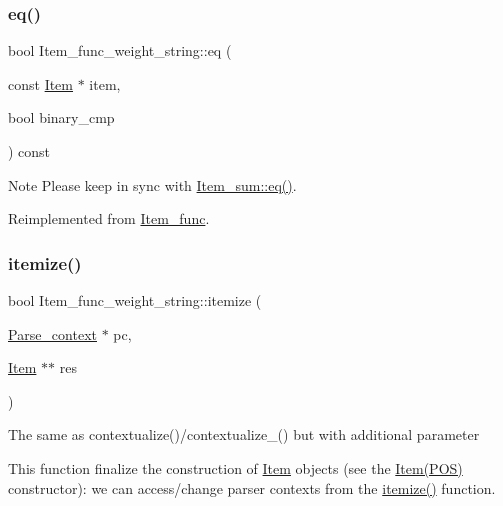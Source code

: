 \subsubsection{\texorpdfstring{eq()}{eq()}}
{\footnotesize\ttfamily bool Item\+\_\+func\+\_\+weight\+\_\+string\+::eq (\begin{DoxyParamCaption}\item[{const \mbox{\hyperlink{classItem}{Item}} $\ast$}]{item,  }\item[{bool}]{binary\+\_\+cmp }\end{DoxyParamCaption}) const\hspace{0.3cm}{\ttfamily [virtual]}}

\begin{DoxyNote}{Note}
Please keep in sync with \mbox{\hyperlink{classItem__sum_aeab749252b834e0be4f00aac8ca523f5}{Item\+\_\+sum\+::eq()}}. 
\end{DoxyNote}


Reimplemented from \mbox{\hyperlink{classItem__func_a3de3f23377e6f0006dfccd375086365f}{Item\+\_\+func}}.

\mbox{\label{classItem__func__weight__string_ad8dca90ccc2473a483b575462bb6fbb5}} 
\subsubsection{\texorpdfstring{itemize()}{itemize()}}
{\footnotesize\ttfamily bool Item\+\_\+func\+\_\+weight\+\_\+string\+::itemize (\begin{DoxyParamCaption}\item[{\mbox{\hyperlink{structParse__context}{Parse\+\_\+context}} $\ast$}]{pc,  }\item[{\mbox{\hyperlink{classItem}{Item}} $\ast$$\ast$}]{res }\end{DoxyParamCaption})\hspace{0.3cm}{\ttfamily [virtual]}}

The same as contextualize()/contextualize\+\_\+() but with additional parameter

This function finalize the construction of \mbox{\hyperlink{classItem}{Item}} objects (see the \mbox{\hyperlink{classItem}{Item(\+P\+O\+S)}} constructor)\+: we can access/change parser contexts from the \mbox{\hyperlink{classItem__func__weight__string_ad8dca90ccc2473a483b575462bb6fbb5}{itemize()}} function.


